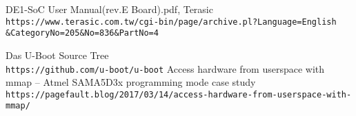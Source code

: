 \begin{thebibliography}{9}
DE1-SoC User Manual(rev.E Board).pdf, Terasic\\ \verb+https://www.terasic.com.tw/cgi-bin/page/archive.pl?Language=English+\\\verb+&CategoryNo=205&No=836&PartNo=4 +
 
Das U-Boot Source Tree\\
\verb+https://github.com/u-boot/u-boot+
Access hardware from userspace with mmap – Atmel SAMA5D3x programming mode case study\\ \verb+https://pagefault.blog/2017/03/14/access-hardware-from-userspace-with-mmap/+

\end{thebibliography}